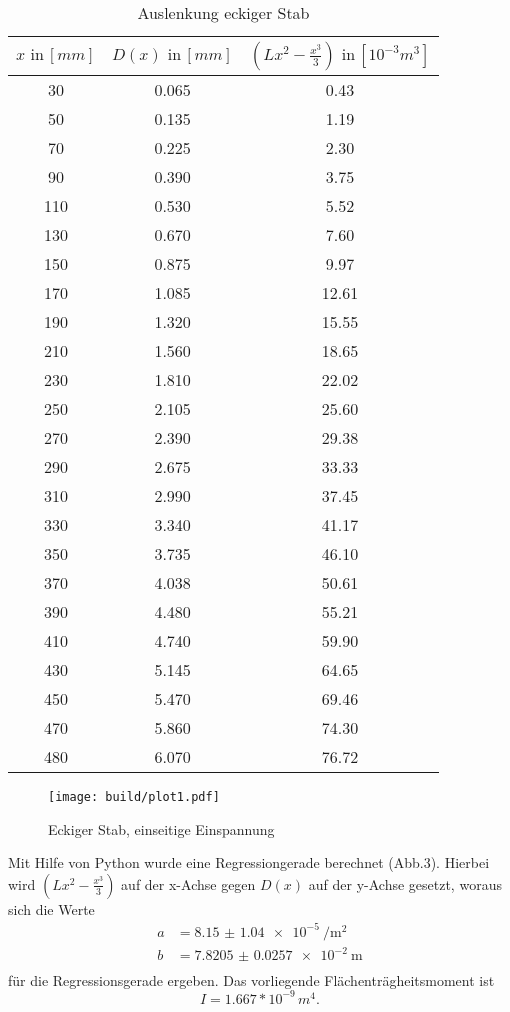\begin{table}[h]
  \centering
  \label{tab:lit2}
  \begin{tabular}{ c c c }
    \toprule
    $x \,\, \text{in} \, [mm]$
   &{$D(x) \,\, \text{in} \, [mm]$}
   &{$(Lx^2- \frac{x^3}{3}) \,\, \text{in} \, [10^{-3}m^3]$} \\

    \midrule
    30  & 0.065& 0.43\\
    50  & 0.135& 1.19\\
    70  & 0.225& 2.30\\
    90  & 0.390& 3.75\\
    110 & 0.530& 5.52\\
    130 & 0.670& 7.60\\
    150 & 0.875& 9.97\\
    170 & 1.085&12.61\\
    190 & 1.320&15.55\\
    210 & 1.560&18.65\\
    230 & 1.810&22.02\\
    250 & 2.105&25.60\\
    270 & 2.390&29.38\\
    290 & 2.675&33.33\\
    310 & 2.990&37.45\\
    330 & 3.340&41.17\\
    350 & 3.735&46.10\\
    370 & 4.038&50.61\\
    390 & 4.480&55.21\\
    410 & 4.740&59.90\\
    430 & 5.145&64.65\\
    450 & 5.470&69.46\\
    470 & 5.860&74.30\\
    480 & 6.070&76.72\\
    \bottomrule
  \end{tabular}
  \caption{Auslenkung eckiger Stab}
\end{table}

\begin{figure}[h]
  \centering
  \texttt{[image: build/plot1.pdf]}
  \caption{Eckiger Stab, einseitige Einspannung}
  \label{fig:plot1}
\end{figure}



Mit Hilfe von Python wurde eine Regressiongerade berechnet (Abb.3).
Hierbei wird $(Lx^2- \frac{x^3}{3})$ auf der x-Achse gegen $D(x)$ auf der y-Achse
gesetzt, woraus sich die Werte
\begin{align*}
  a &= \SI{8.15(104)e-5}{\per\square\meter} \\
  b &= \SI{7.8205(257)e-2}{\meter} \\
\end{align*}
für die Regressionsgerade ergeben.
\newline
Das vorliegende Flächenträgheitsmoment ist
\begin{equation*}
  I = 1.667* 10^{-9}\, m^4.
\end{equation*}


